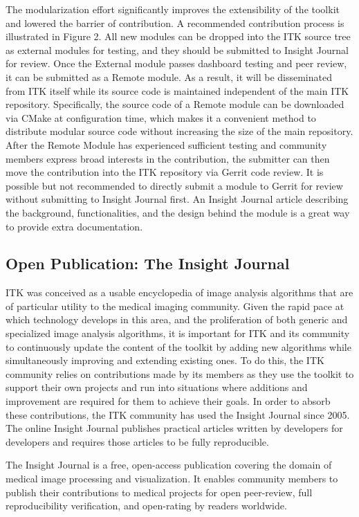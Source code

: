 \documentclass{frontiersENG} %
\begin{document}
The modularization effort significantly improves the extensibility of the
toolkit and lowered the barrier of contribution. A recommended contribution
process is illustrated in Figure 2.  All new modules can be dropped
into the ITK source tree as external modules for testing, and they should be
submitted to Insight Journal for review. Once the External module passes
dashboard testing and peer review, it can be submitted as a Remote module. As
a result, it will be disseminated from ITK itself while its source code is
maintained independent of the main ITK repository. Specifically, the source
code of a Remote module can be downloaded via CMake at configuration
time, which makes it a convenient method to distribute modular source code
without increasing the size of the main repository. After the Remote Module
has experienced sufficient testing and community members express broad
interests in the contribution, the submitter can then move the contribution
into the ITK repository via Gerrit code review.  It is possible but not
recommended to directly submit a module to Gerrit for review without
submitting to Insight Journal first. An Insight Journal article describing the
background, functionalities, and the design behind the module is a great way
to provide extra documentation.


\subsection{Open Publication: The Insight Journal}
ITK was conceived as a usable encyclopedia of image analysis algorithms
that are of particular utility to the medical imaging community. Given the
rapid pace at which technology develops in this area, and the proliferation of
both generic and specialized image analysis algorithms, it is important for ITK
and its community to continuously update the content of the toolkit by adding
new algorithms while simultaneously improving and extending existing ones. To
do this, the ITK community relies on contributions made by its members as they
use the toolkit to support their own projects and run into situations where
additions and improvement are required for them to achieve their goals. In
order to absorb these contributions, the ITK community has used the Insight
Journal \cite{InsightJournal} since 2005. The online Insight Journal
publishes practical articles written by developers for developers and requires
those articles to be fully reproducible.

The Insight Journal is a free, open-access publication covering the domain of
medical image processing and visualization. It enables community members to
publish their contributions to medical projects for open peer-review, full
reproducibility verification, and open-rating by readers worldwide.
\end{document}
